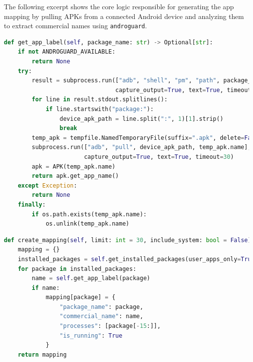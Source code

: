 \documentclass[a4paper,12pt]{report}
\begin{document}
The following excerpt shows the core logic responsible for generating the app mapping by pulling APKs from a connected Android device and analyzing them to extract commercial names using \texttt{androguard}.



\begin{lstlisting}[language=Python]
def get_app_label(self, package_name: str) -> Optional[str]:
    if not ANDROGUARD_AVAILABLE:
        return None
    try:
        result = subprocess.run(["adb", "shell", "pm", "path", package_name],
                                capture_output=True, text=True, timeout=10)
        for line in result.stdout.splitlines():
            if line.startswith("package:"):
                device_apk_path = line.split(":", 1)[1].strip()
                break
        temp_apk = tempfile.NamedTemporaryFile(suffix=".apk", delete=False)
        subprocess.run(["adb", "pull", device_apk_path, temp_apk.name],
                       capture_output=True, text=True, timeout=30)
        apk = APK(temp_apk.name)
        return apk.get_app_name()
    except Exception:
        return None
    finally:
        if os.path.exists(temp_apk.name):
            os.unlink(temp_apk.name)
\end{lstlisting}


\newpage
\begin{lstlisting}[language=Python]
def create_mapping(self, limit: int = 30, include_system: bool = False) -> Dict[str, Dict]:
    mapping = {}
    installed_packages = self.get_installed_packages(user_apps_only=True)
    for package in installed_packages:
        name = self.get_app_label(package)
        if name:
            mapping[package] = {
                "package_name": package,
                "commercial_name": name,
                "processes": [package[-15:]],
                "is_running": True
            }
    return mapping
\end{lstlisting}
\end{document}
